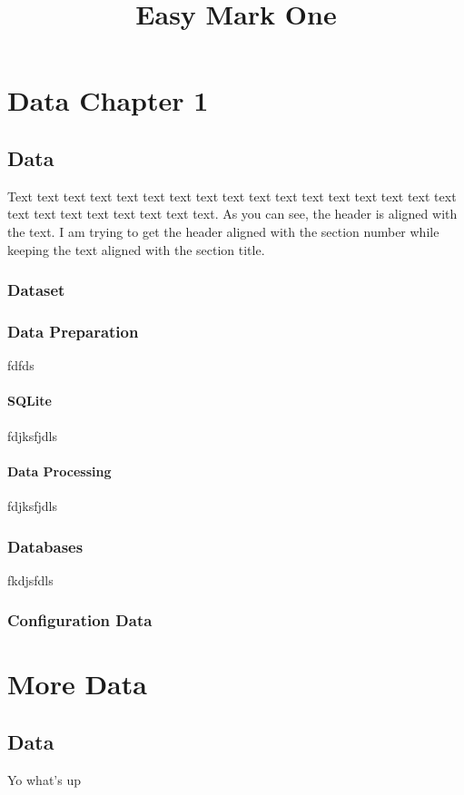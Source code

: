 \documentclass[12pt,a4paper,oneside]{report}
\title{Easy Mark One}
\author{\IfPrivateBuild{\EmRealAuthorName}{T0astBread}}
\begin{document}
	\maketitle
	\tableofcontents
	\newpage
	\chapter{Data Chapter 1}
	\section{Data}
	Text text text text text text text text text text text text text text text text text text text text text text text text text.
	As you can see, the header is aligned with the text. I am trying to get the header aligned with the section number while keeping the text aligned with the section title.
	\subsection{Dataset}
	\lipsum
	\subsection{Data Preparation}
	fdfds
	\subsubsection{SQLite}
	fdjksfjdls
	\subsubsection{Data Processing}
	fdjksfjdls
	\subsection{Databases}
	fkdjsfdls
	\subsection{Configuration Data}
	\chapter{More Data}
	\section{Data}
	Yo what's up
\end{document}
